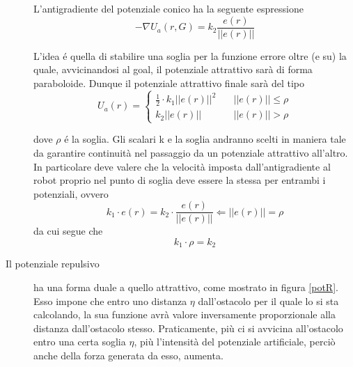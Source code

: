 \documentclass[14pt,a4paper]{extarticle}
\begin{document}
\begin{description}
\begin{figure}[H]
\label{potA}
\end{figure}
L'antigradiente del potenziale conico ha la seguente espressione
\begin{equation}
-\nabla U_a(r,G) = k_2\frac{e(r)}{||e(r)||}
\end{equation}

L'idea é quella di stabilire una soglia per la funzione errore oltre (e su) la quale, avvicinandosi al goal, il potenziale attrattivo sarà di forma paraboloide. 
Dunque il potenziale attrattivo finale sarà del tipo
\begin{equation}
\label{potAC}
U_a(r) = 
\begin{cases}
\frac{1}{2} \cdot k_1 ||e(r)||^2 \quad &||e(r)|| \leq \rho \\
k_2||e(r)|| \quad &||e(r)|| > \rho
\end{cases}
\end{equation}

dove \(\rho\) é la soglia.  Gli scalari k e la soglia andranno scelti in maniera tale da garantire continuità nel passaggio da un potenziale attrattivo all'altro. In particolare deve valere che la velocità imposta dall'antigradiente al robot proprio nel punto di soglia deve essere la stessa per entrambi i potenziali, ovvero
\[k_1 \cdot e(r) = k_2 \cdot \frac{e(r)}{||e(r)||} \Leftarrow ||e(r)|| = \rho\]
da cui segue che 
\begin{equation}
\label{parconswitch}
k_1 \cdot \rho = k_2 
\end{equation}

\item[Il potenziale repulsivo] ha una forma duale a quello attrattivo, come mostrato in figura \ref{potR}. Esso impone che entro uno distanza \(\eta\) dall'ostacolo per il quale lo si sta calcolando, la sua funzione avrà valore inversamente proporzionale alla distanza dall'ostacolo stesso. Praticamente, più ci si avvicina all'ostacolo entro una certa soglia \(\eta\), più l'intensità del potenziale artificiale, perciò anche della forza generata da esso, aumenta.


\end{description}
\end{document}
